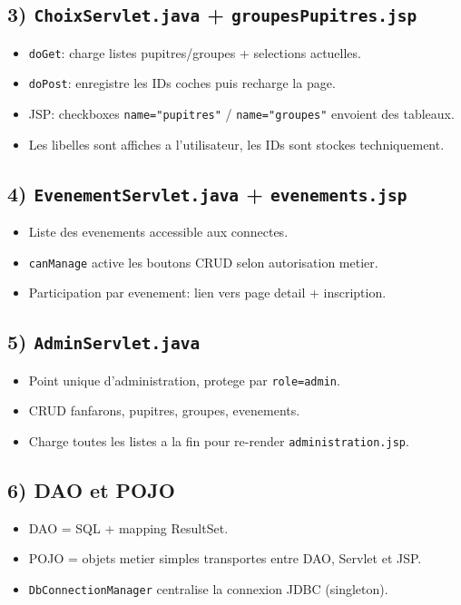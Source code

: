 ﻿\documentclass[11pt,a4paper]{article}
\begin{document}
\subsection*{3) \texttt{ChoixServlet.java} + \texttt{groupesPupitres.jsp}}
\begin{itemize}
  \item \texttt{doGet}: charge listes pupitres/groupes + selections actuelles.
  \item \texttt{doPost}: enregistre les IDs coches puis recharge la page.
  \item JSP: checkboxes \texttt{name="pupitres"} / \texttt{name="groupes"} envoient des tableaux.
  \item Les libelles sont affiches a l'utilisateur, les IDs sont stockes techniquement.
\end{itemize}

\subsection*{4) \texttt{EvenementServlet.java} + \texttt{evenements.jsp}}
\begin{itemize}
  \item Liste des evenements accessible aux connectes.
  \item \texttt{canManage} active les boutons CRUD selon autorisation metier.
  \item Participation par evenement: lien vers page detail + inscription.
\end{itemize}

\subsection*{5) \texttt{AdminServlet.java}}
\begin{itemize}
  \item Point unique d'administration, protege par \texttt{role=admin}.
  \item CRUD fanfarons, pupitres, groupes, evenements.
  \item Charge toutes les listes a la fin pour re-render \texttt{administration.jsp}.
\end{itemize}

\subsection*{6) DAO et POJO}
\begin{itemize}
  \item DAO = SQL + mapping ResultSet.
  \item POJO = objets metier simples transportes entre DAO, Servlet et JSP.
  \item \texttt{DbConnectionManager} centralise la connexion JDBC (singleton).
\end{itemize}
\end{document}
